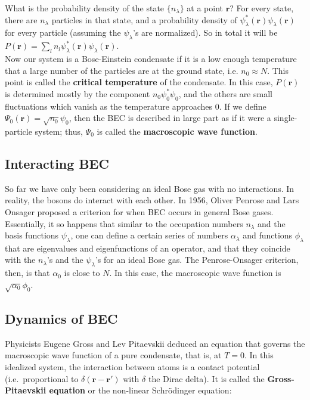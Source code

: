 \documentclass{article}
\begin{document}
What is the probability density of the state $\{n_\lambda\}$ at a point $\mathbf{r}$?  For every state, there are $n_\lambda$ particles in that state, and a probability density of $\psi_\lambda^*(\mathbf{r}) \psi_\lambda(\mathbf{r})$ for every particle (assuming the $\psi_\lambda$'s are normalized). So in total it will be $P(\mathbf{r}) = \sum_l{n_l \psi_\lambda^*(\mathbf{r}) \psi_\lambda(\mathbf{r})}$.
\\

Now our system is a Bose-Einstein condensate if it is a low enough temperature that a large number of the particles are at the ground state, i.e. $n_0 \approx N$.  This point is called the \textbf{critical temperature} of the condensate.  In this case, $P(\mathbf{r})$ is determined mostly by the component $n_0\psi^*_0\psi_0$, and the others are small fluctuations which vanish as the temperature approaches $0$.  If we define $\Psi_0(\mathbf{r}) = \sqrt{n_0} \psi_0$, then the BEC is described in large part as if it were a single-particle system; thus, $\Psi_0$ is called the \textbf{macroscopic wave function}.

\subsection{Interacting BEC}

So far we have only been considering an ideal Bose gas with no interactions.  In reality, the bosons do interact with each other.  In 1956, Oliver Penrose and Lars Onsager proposed a criterion for when BEC occurs in general Bose gases.  Essentially, it so happens that similar to the occupation numbers $n_\lambda$ and the basis functions $\psi_\lambda$, one can define a certain series of numbers $\alpha_\lambda$ and functions $\phi_\lambda$ that are eigenvalues and eigenfunctions of an operator, and that they coincide with the $n_\lambda$'s and the $\psi_\lambda$'s for an ideal Bose gas.  The Penrose-Onsager criterion, then, is that $\alpha_0$ is close to $N$.  In this case, the macroscopic wave function is $\sqrt{\alpha_0} \phi_0$. 

\subsection{Dynamics of BEC}

Physicists Eugene Gross and Lev Pitaevskii deduced an equation that governs the macroscopic wave function of a pure condensate, that is, at $T = 0$.  In this idealized system, the interaction between atoms is a contact potential (i.e.\ proportional to $\delta(\mathbf{r}-\mathbf{r}')$ with $\delta$ the Dirac delta). It is called the \textbf{Gross-Pitaevskii equation} or the non-linear Schrödinger equation:
\end{document}
